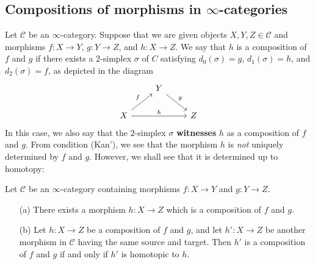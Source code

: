 \subsection{Compositions of morphisms in \texorpdfstring{$\infty$}{inf}-categories}
Let $\mathcal{C}$ be an $\infty$-category. Suppose that we are given objects $X,Y,Z\in\mathcal{C}$ and morphisms $f:X\to Y$, $g:Y\to Z$, and $h:X\to Z$. We say that $h$ is a composition of $f$ and $g$ if there exists a $2$-simplex $\sigma$ of $C$ satisfying $d_0(\sigma)=g$, $d_1(\sigma)=h$, and $d_2(\sigma)=f$, as depicted in the diagram
\[\begin{tikzcd}
&Y\ar[rd,"g"]&\\
X\ar[ru,"f"]\ar[rr,"h"]&&Z
\end{tikzcd}\]
In this case, we also say that the $2$-simplex $\sigma$ \textbf{witnesses} $h$ as a composition of $f$ and $g$. From condition (Kan'), we see that the morphism $h$ is \textit{not} uniquely determined by $f$ and $g$. However, we shall see that it is determined up to homotopy:
\begin{proposition}\label{simplicial set inf-cat composition unique up to homotopy}
Let $\mathcal{C}$ be an $\infty$-category containing morphisms $f:X\to Y$ and $g:Y\to Z$.
\begin{itemize}
\item[(a)] There exists a morphism $h:X\to Z$ which is a composition of $f$ and $g$.
\item[(b)] Let $h:X\to Z$ be a composition of $f$ and $g$, and let $h':X\to Z$ be another morphism in $\mathcal{C}$ having the same source and target. Then $h'$ is a composition of $f$ and $g$ if and only if $h'$ is homotopic to $h$.
\end{itemize}
\end{proposition}
